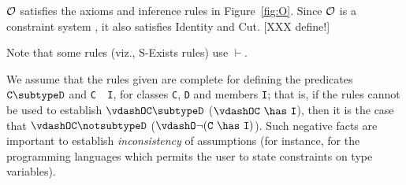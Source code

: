 $\cal O$ satisfies the axioms and inference rules in
Figure~\ref{fig:O}. Since $\cal O$ is a constraint system \cite{cccc},
it also satisfies Identity and Cut.
[XXX define!]

Note that some rules (viz., {\sc S-Exists} rules) use $\vdash$. 

We assume that the rules given are complete for
defining the predicates $\tt C \subtype D$ and {\tt C\ \has\ I}, for
classes {\tt C}, {\tt D} and members {\tt I}; that is, if the rules
cannot be used to establish $\tt \vdashO C \subtype D$
($\tt \vdashO C\ \has\ I$), then it is the case that
$\tt \vdashO C \notsubtype D$ ($\tt \vdashO \neg (C\ \has\
I)$).
%
Such negative facts are important to establish {\em inconsistency} of
assumptions (for instance, for the programming languages which permits
the user to state constraints on type variables).  

